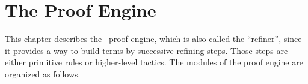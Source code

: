 
\newpage
\section*{The Proof Engine}

\ocwsection \label{proofs}
This chapter describes the \Coq\ proof engine, which is also called
the ``refiner'', since it provides a way to build terms by successive
refining steps. Those steps are either primitive rules or higher-level
tactics.
The modules of the proof engine are organized as follows.

\bigskip
\begin{center}\end{center}

